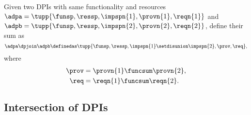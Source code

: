 \begin{definition}
    \label{def:parallel-1}
    Given two DPIs with same functionality and resources~$\adpa=\tupp{\funsp,\ressp,\impspn{1},\provn{1},\reqn{1}}$ and~$\adpb=\tupp{\funsp,\ressp,\impspn{2},\provn{2},\reqn{2}}$, define their sum as
    \begin{equation}
        \adpa \dpjoin\adpb\definedas\tupp{\funsp,\ressp,\impspn{1}\setdisunion\impspn{2},\prov,\req},
    \end{equation}
    where
    \begin{equation}
        \begin{aligned}
            \prov & = \provn{1} \funcsum \provn{2}, \\
            \req  & = \reqn{1} \funcsum \reqn{2}.
        \end{aligned}
    \end{equation}

\end{definition}

%

\subsection{Intersection of DPIs}

\begin{marginfigure}
    \centering
    \caption{}
    \label{fig:intersection}
\end{marginfigure}

